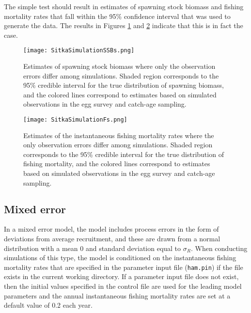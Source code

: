 \documentclass[12pt,letterpaper]{article}
\begin{document}
   The simple test should result in estimates of spawning stock biomass and fishing mortality rates that fall within the 95\% confidence interval that was used to generate the data.  The results in Figures \ref{fig.SimulatedSSB} and \ref{fig.SimulatedFs} indicate that this is in fact the case. 


  \begin{figure}
    \label{fig.SimulatedSSB}
    \centering
    \texttt{[image: SitkaSimulationSSBs.png]}
    \caption{Estimates of spawning stock biomass where only the observation errors differ among simulations. Shaded region corresponds to the 95\% credible interval for the true distribution of spawning biomass, and the colored lines correspond to estimates based on simulated observations in the egg survey and catch-age sampling.}
  \end{figure}  

  \begin{figure}
    \label{fig.SimulatedFs}
    \centering
    \texttt{[image: SitkaSimulationFs.png]}
    \caption{Estimates of the instantaneous fishing mortality rates where the only observation errors differ among simulations. Shaded region corresponds to the 95\% credible interval for the true distribution of fishing mortality, and the colored lines correspond to estimates based on simulated observations in the egg survey and catch-age sampling.}
  \end{figure}



  \subsection{Mixed error} %
  \label{sub:mixed_error_simulations}
  
  In a mixed error model, the model includes process errors in the form of deviations from average recruitment, and these are drawn from a normal distribution with a mean 0 and standard deviation equal to $\sigma_R$.  When conducting simulations of this type, the model is conditioned on the instantaneous fishing mortality rates that are specified in the parameter input file (\texttt{ham.pin}) if the file exists in the current working directory. If a parameter input file does not exist, then the initial values specified in the control file are used for the leading model parameters and the annual instantaneous fishing mortality rates are set at a default value of 0.2 each year.
\end{document}
